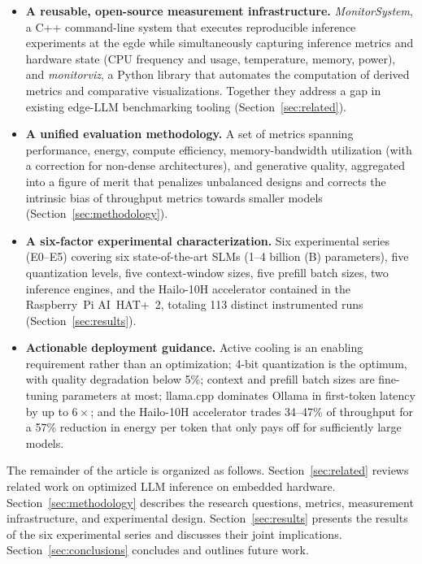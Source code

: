 \documentclass[acmsmall,natbib=false]{acmart}
\begin{document}
\begin{itemize}
  \item \textbf{A reusable, open-source measurement infrastructure.}
    \textit{MonitorSystem}, a C++ command-line system that executes
    reproducible inference experiments at the egde while simultaneously capturing
    inference metrics and hardware state (CPU frequency and usage,
    temperature, memory, power), and \textit{monitorviz}, a Python library
    that automates the computation of derived metrics and comparative
    visualizations. Together they address a gap in existing edge-LLM
    benchmarking tooling (Section~\ref{sec:related}).
  \item \textbf{A unified evaluation methodology.} A set of metrics spanning
    performance, energy, compute efficiency, memory-bandwidth utilization
    (with a correction for non-dense architectures), and generative quality,
    aggregated into a figure of merit that penalizes unbalanced designs and
    corrects the intrinsic bias of throughput metrics towards smaller models
    (Section~\ref{sec:methodology}).
  \item \textbf{A six-factor experimental characterization.} Six experimental
    series (E0--E5) covering six state-of-the-art SLMs (1--4 billion (B) parameters),
    five quantization levels, five context-window sizes, five prefill batch
    sizes, two inference engines, and the Hailo-10H accelerator contained in
    the Raspberry~Pi AI~HAT+~2, totaling 113 distinct instrumented runs
    (Section~\ref{sec:results}).
  \item \textbf{Actionable deployment guidance.} Active cooling is an
    enabling requirement rather than an optimization; 4-bit quantization is
    the optimum, with quality degradation below
    5\%; context and prefill batch sizes are fine-tuning parameters at most;
    llama.cpp dominates Ollama in first-token latency by up to $6\times$; and
    the Hailo-10H accelerator trades 34--47\% of throughput for a 57\%
    reduction in energy per token that only pays off for sufficiently large
    models.
\end{itemize}

The remainder of the article is organized as follows.
Section~\ref{sec:related} reviews related work on optimized LLM inference on
embedded hardware. Section~\ref{sec:methodology} describes the research
questions, metrics, measurement infrastructure, and experimental design.
Section~\ref{sec:results} presents the results of the six experimental
series and discusses their joint implications.
Section~\ref{sec:conclusions} concludes and outlines future work.
\end{document}
